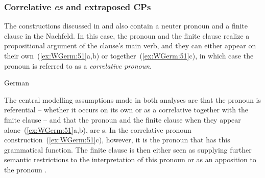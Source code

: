 \documentclass[output=paper,hidelinks]{langscibook}
\begin{document}
\subsubsection{Correlative \textit{es} and extraposed CPs}

The constructions discussed in \citet{berman-etal:1998:lfg} and
\citet[Chapter~8]{Berman2003} also contain a neuter pronoun and a
finite clause in the Nachfeld. In this case, the pronoun and the finite
clause realize a propositional argument of the clause's main verb, and
they can either appear on their own~(\ref{ex:WGerm:51}a,b) or
together~(\ref{ex:WGerm:51}c), in which case the pronoun is referred to as a
\textit{correlative pronoun}.
%
\begin{exe}
\ex\label{ex:WGerm:51} German \citep[§1, examples 1 and 2]{berman-etal:1998:lfg}
\begin{xlist}
  \end{xlist}
 \end{exe}
%
The central modelling assumptions made in both analyses are that the
pronoun is referential -- whether it occurs on its own or as a
correlative together with the finite clause -- and that the pronoun
and the finite clause when they appear alone~(\ref{ex:WGerm:51}a,b), are
\OBJ{}s. In the correlative pronoun construction~(\ref{ex:WGerm:51}c), however,
it is the pronoun that has this grammatical function.  The finite
clause is then either seen as supplying further semantic restrictions
to the interpretation of this pronoun \citep[see also
   above]{berman-etal:1998:lfg} or as an
apposition to the pronoun \citep{Berman2003}. 
\end{document}
